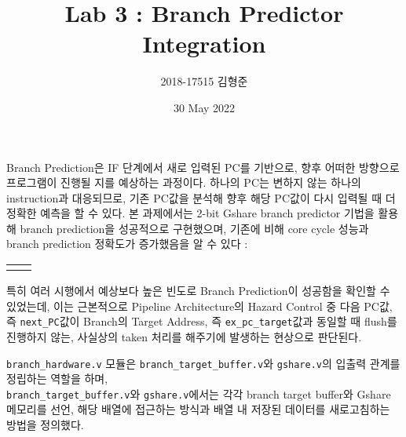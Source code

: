 \documentclass[10pt]{article}
\begin{document}
  \title{Lab 3 : Branch Predictor Integration}
  \author{2018-17515 김형준}
  \date{30 May 2022}
  \maketitle
  \thispagestyle{empty}

Branch Prediction은 IF 단계에서 새로 입력된 PC를 기반으로, 향후 어떠한 방향으로
프로그램이 진행될 지를 예상하는 과정이다. 하나의 PC는 변하지 않는 하나의
instruction과 대응되므로, 기존 PC값을 분석해 향후 해당 PC값이 다시 입력될 때
더 정확한 예측을 할 수 있다. 본 과제에서는 2-bit Gshare branch predictor 기법을
활용해 branch prediction을 성공적으로 구현했으며, 기존에 비해 core cycle 성능과
branch prediction 정확도가 증가했음을 알 수 있다 :

\begin{center}
  \begin{tabular}{ *2{C{.48\linewidth} } }
    
     &
    
     \\
  \end{tabular}
\end{center}

특히 여러 시행에서 예상보다 높은 빈도로 Branch Prediction이 성공함을 확인할 수
있었는데, 이는 근본적으로 Pipeline Architecture의 Hazard Control 중 다음 PC값,
즉 \verb+next_PC+값이 Branch의 Target Address, 즉 \verb+ex_pc_target+값과
동일할 때 flush를 진행하지 않는, 사실상의 taken 처리를 해주기에 발생하는
현상으로 판단된다.

\verb+branch_hardware.v+ 모듈은 \verb+branch_target_buffer.v+와
\verb+gshare.v+의 입출력 관계를 정립하는 역할을 하며, \\
\verb+branch_target_buffer.v+와 \verb+gshare.v+에서는 각각 branch target
buffer와 Gshare 메모리를 선언, 해당 배열에 접근하는 방식과 배열 내 저장된
데이터를 새로고침하는 방법을 정의했다.
\end{document}
